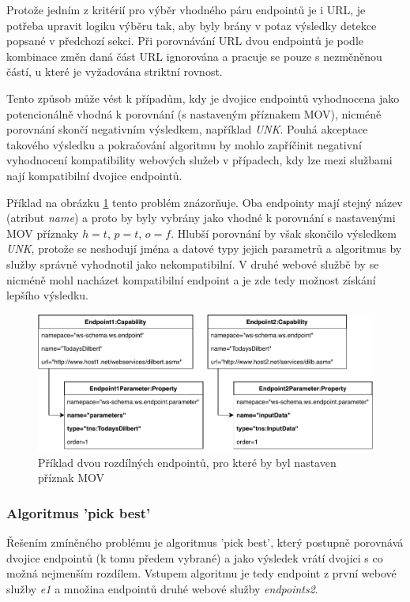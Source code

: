 \documentclass[czech,DP]{thesiskiv}
\begin{document}
Protože jedním z kritérií pro výběr vhodného páru endpointů je i URL, je potřeba upravit logiku výběru tak, aby byly brány v potaz výsledky detekce popsané v předchozí sekci. Při porovnávání URL dvou endpointů je podle kombinace změn daná část URL ignorována a pracuje se pouze s nezměněnou částí, u které je vyžadována striktní rovnost.

Tento způsob může vést k případům, kdy je dvojice endpointů vyhodnocena jako potencionálně vhodná k porovnání (s nastaveným příznakem MOV), nicméně porovnání skončí negativním výsledkem, například \textit{UNK}. Pouhá akceptace takového výsledku a pokračování algoritmu by mohlo zapříčinit negativní vyhodnocení kompatibility webových služeb v případech, kdy lze mezi službami nají kompatibilní dvojice endpointů.

Příklad na obrázku \ref{fig:mov-bad-example} tento problém znázorňuje. Oba endpointy mají stejný název (atribut \textit{name}) a proto by byly vybrány jako vhodné k porovnání s nastavenými MOV příznaky $h=t$, $p=t$, $o=f$. Hlubší porovnání by však skončilo výsledkem \textit{UNK}, protože se neshodují jména a datové typy jejich parametrů a algoritmus by služby správně vyhodnotil jako nekompatibilní. V druhé webové službě by se nicméně mohl nacházet kompatibilní endpoint a je zde tedy možnost získání lepšího výsledku.

\begin{figure}[h]
	\centering
	\includegraphics[width=\linewidth]{mov-example-bad}
	\caption{Příklad dvou rozdílných endpointů, pro které by byl nastaven příznak MOV}
	\label{fig:mov-bad-example}
\end{figure}

\subsubsection{Algoritmus 'pick best'}
Řešením zmíněného problému je algoritmus 'pick  best', který postupně porovnává dvojice endpointů (k tomu předem vybrané) a jako výsledek vrátí dvojici s co možná nejmenším rozdílem. Vstupem algoritmu je tedy endpoint z první webové služby \textit{e1} a množina endpointů druhé webové služby \textit{endpoints2}. 
\end{document}
